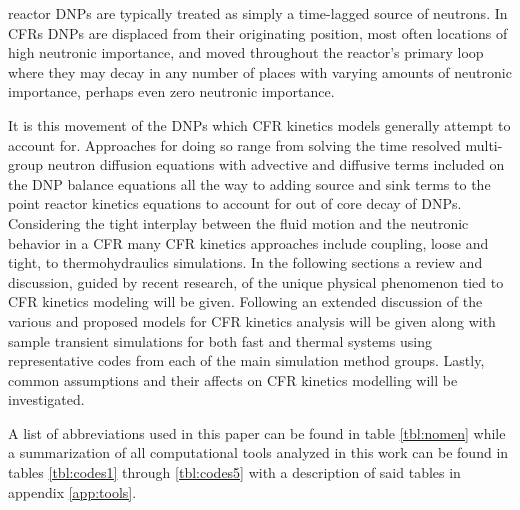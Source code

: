 \documentclass[review]{elsarticle}
\begin{document}
reactor DNPs are typically treated as simply a time-lagged source of neutrons.
In CFRs DNPs are displaced from their originating position, most often locations
of high neutronic importance, and moved throughout the reactor's primary loop
where they may decay in any number of places with varying amounts of
neutronic importance, perhaps even zero neutronic importance. 
\par It is this movement of the DNPs which CFR kinetics models generally
attempt to account for. Approaches for doing so range from solving the 
time resolved multi-group neutron diffusion equations with advective and
diffusive terms included on the DNP balance equations all the way to adding
source and sink terms to the point reactor kinetics equations to account
for out of core decay of DNPs. Considering the tight interplay between the
fluid motion and the neutronic behavior in a CFR many CFR kinetics approaches
include coupling, loose and tight, to thermohydraulics simulations. In the
following sections a review and discussion, guided by recent research, of the
unique physical phenomenon tied to CFR kinetics modeling will be given. 
Following an extended discussion of the various and proposed models for CFR
kinetics analysis will be given along with sample transient simulations for
both fast and thermal systems using representative codes from each of the main
simulation method groups. Lastly, common assumptions and their affects on CFR
kinetics modelling will be investigated.
\par A list of abbreviations used in this paper can be found in table
\ref{tbl:nomen} while a summarization of all computational tools analyzed
in this work can be found in tables \ref{tbl:codes1} through \ref{tbl:codes5}
 with a description of said
tables in appendix \ref{app:tools}.
\end{document}
